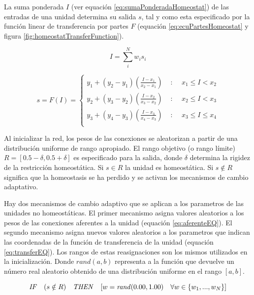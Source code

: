 La suma ponderada $I$ (ver equación \ref{eq:sumaPonderadaHomeostat}) de las entradas de una unidad determina su salida $s$, tal y como esta especificado por la función linear de transferencia por
partes $F$ (equación \ref{eq:ecuPartesHomeostat} y figura \ref{fig:homeostatTransferFunction}).

\begin{equation} \label{eq:sumaPonderadaHomeostat}
	I = \sum_{i}^{N}w_{i}s_{i}
\end{equation}

\begin{equation} \label{eq:ecuPartesHomeostat}
	s = F(I)=\begin{cases}
y_{1}+(y_{2}-y_{1})(\frac{I-x_{1}}{x_{2}-x_{1}}) & \text{ : }\quad x_{1} \leq I < x_{2} \\
y_{2}+(y_{3}-y_{2})(\frac{I-x_{2}}{x_{3}-x_{2}}) & \text{ : }\quad x_{2} \leq I < x_{3} \\
y_{3}+(y_{4}-y_{3})(\frac{I-x_{3}}{x_{4}-x_{3}}) & \text{ : }\quad x_{3} \leq I \leq  x_{4} \\
\end{cases}
\end{equation}

Al inicializar la red, los pesos de las conexiones se aleatorizan a partir de una distribución uniforme de rango apropiado. El rango objetivo (o rango límite) $R = [0.5 - \delta, 0.5 + \delta]$ es
especificado para la salida, donde $\delta$ determina la rigidez de la restricción homeostática. Si $s \in R$ la unidad es homeostática. Si $s \notin R$ significa que la homeostasis se ha perdido
y se activan los mecanismos de cambio adaptativo.

Hay dos mecanismos de cambio adaptivo que se aplican a los parametros de las unidades no homeostáticas. El primer mecanismo asigna valores aleatorios a los pesos de las conexiones aferentes a la unidad (equación \ref{eq:aferenteEQ}).
El segundo mecanismo asigna nuevos valores aleatorios a los parametros que indican las coordenadas de la función de transferencia de la unidad (equación \ref{eq:transferEQ}). Los rangos de estas reasignaciones son los mismos utilizados
en la inicialización. Donde $rand(a,b)$ representa a la función que devuelve un número real aleatorio obtenido de una distribución uniforme en el rango $[a,b]$.

\begin{equation} \label{eq:aferenteEQ}
	\text{\textit{IF}} \quad (s \notin R) \quad \text{\textit{THEN}} \quad [w= \text{\textit{rand}}(0.00, 1.00) \quad \forall w \in \left \{ w_{1},...,w_{N} \right \}]
\end{equation}

